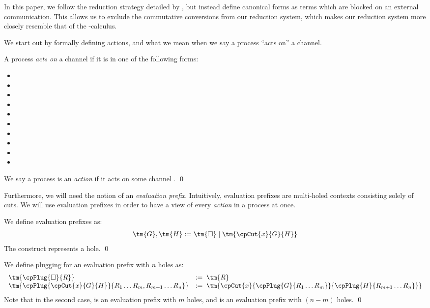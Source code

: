 \documentclass[UKenglish]{llncs}
\begin{document}
In this paper, we follow the reduction strategy detailed by
\citeauthor{lindley2015semantics}, but instead define canonical forms as terms
which are blocked on an external communication.
This allows us to exclude the commutative conversions from our reduction system,
which makes our reduction system more closely resemble that of the
\textpi-calculus.

We start out by formally defining actions, and what we mean when we say a
process ``acts on'' a channel.
\begin{definition}[Actions]\label{def:cp-action}
  A process  \emph{acts on} a channel  if it is in one of the
  following forms:
  \begin{multicols}{3}
    \begin{itemize}[noitemsep,topsep=0pt,parsep=0pt,partopsep=0pt]
    \item {}
    \item {}
    \item {}
    \item {}
    \item {}
    \item {}
    \item {}
    \item {}
    \item {}
    \item {}
    \end{itemize}
  \end{multicols}
  \noindent
  We say a process  is an \emph{action} if it acts on some channel .
  \qed
\end{definition}
Furthermore, we will need the notion of an \emph{evaluation prefix}.
Intuitively, evaluation prefixes are multi-holed contexts consisting solely of
cuts. We will use evaluation prefixes in order to have a view of every
\emph{action} in a process at once.
\begin{definition}\label{def:cp-evaluation-prefixes}
  We define evaluation prefixes as:
  \begin{align*}
    \tm{G}, \tm{H} := \tm{\Box} \mid \tm{\cpCut{x}{G}{H}}
  \end{align*}
  The \tm{\Box} construct represents a hole.
  \qed
\end{definition}
\begin{definition}[Plugging]\label{def:cp-evaluation-prefix-plugging}
  We define plugging for an evaluation prefix with $n$ holes as:
  \[
    \begin{array}{ll}
      \tm{\cpPlug{\Box}{R}} & := \; \tm{R} \\
      \tm{\cpPlug{\cpCut{x}{G}{H}}{R_1 \dots R_m, R_{m+1} \dots R_{n}}}
                            & := \; \tm{\cpCut{x}{\cpPlug{G}{R_1 \dots R_m}}{\cpPlug{H}{R_{m+1} \dots R_n}}}
    \end{array}
  \]
  Note that in the second case,  is an evaluation prefix with $m$ holes,
  and  is an evaluation prefix with $(n-m)$ holes.
  \qed
\end{definition}
\end{document}
